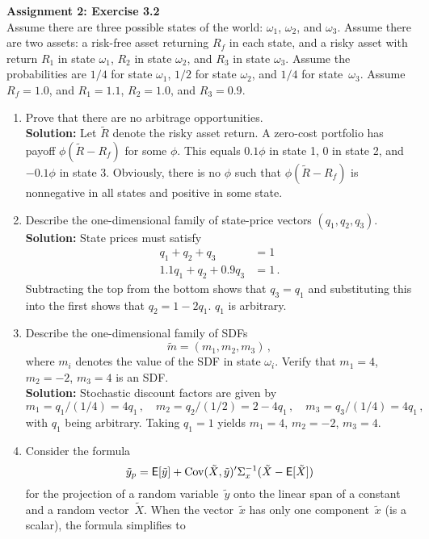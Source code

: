 \documentclass[11pt]{article}
\newcommand{\mye}{\ensuremath{\mathsf{E}}}
\newcommand{\sol}{\textbf{Solution:} \hspace{2ex}}
\theoremstyle{definition}
\begin{document}
\begin{enumerate}
%
%
\newpage\noindent \textbf{Assignment 2: Exercise 3.2}\\
\noindent 
 Assume there are three possible states of the world: $\omega_1$, $\omega_2$, and $\omega_3$.   Assume there are two assets: a risk-free asset returning $R_f$ in each state, and a risky asset with return $R_1$ in state $\omega_1$, $R_2$ in state $\omega_2$, and $R_3$ in state $\omega_3$.  Assume the probabilities are $1/4$ for state $\omega_1$, $1/2$ for state $\omega_2$, and $1/4$ for state~$\omega_3$.  Assume $R_f=1.0$, and $R_1=1.1$, $R_2 = 1.0$, and $R_3 = 0.9$.
\begin{enumerate}\renewcommand{\labelenumi}{(\alph{enumi})}
\item Prove that there are no arbitrage opportunities.\\
\noindent\sol Let $\tilde{R}$ denote the risky asset return.  A zero-cost portfolio has payoff $\phi(\tilde{R}-R_f)$ for some $\phi$.  This equals $0.1\phi$ in state 1, 0 in state 2, and $-0.1\phi$ in state 3.  Obviously, there is no $\phi$ such that $\phi(\tilde{R}-R_f)$ is nonnegative in all states and positive in some state.
\item Describe the one-dimensional family of state-price vectors $(q_1,q_2,q_3)$.\\
\noindent\sol State prices must satisfy
\begin{align*}
q_1 + q_2 + q_3 &=1\,\\
1.1 q_1 + q_2 + 0.9 q_3 &=1\,.
\end{align*}
Subtracting the top from the bottom shows that $q_3=q_1$ and substituting this into the first shows that $q_2 = 1-2 q_1$.  $q_1$ is arbitrary.
\item Describe the one-dimensional family of SDFs
$$\tilde{m}=(m_1, m_2, m_3)\,,$$
 where $m_i$ denotes the value of the SDF in state $\omega_i$.  Verify that $m_1=4$, $m_2=-2$, $m_3=4$ is an SDF.\\
 \noindent\sol Stochastic discount factors are given by
 $$m_1 = q_1/(1/4) = 4q_1\,, \quad m_2 = q_2/(1/2) = 2-4q_1\,, \quad m_3 = q_3/(1/4) = 4 q_1\,,$$
 with $q_1$ being arbitrary.  Taking $q_1=1$ yields $m_1=4$, $m_2=-2$, $m_3 = 4$.
\item Consider the formula
$$
\tilde{y}_p = \mye[\tilde{y}]+  \Cov(\tilde{X},\tilde{y})'\Sigma_x^{-1}( \tilde{X} -\mye[\tilde{X}])$$
for the projection of a random variable~$\tilde{y}$ onto the linear span of a constant and a random vector~$\tilde{X}$.  When the vector~$\tilde{x}$ has only one component~$\tilde{x}$ (is a scalar),  the formula simplifies to

\end{enumerate}
\end{enumerate}
\end{document}
